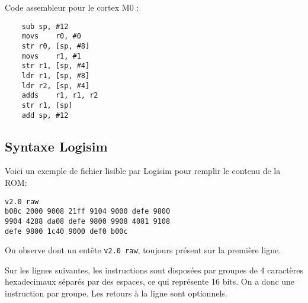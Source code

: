 Code assembleur pour le cortex M0 :
\begin{lstlisting}
	sub	sp, #12
	movs	r0, #0
	str	r0, [sp, #8]
	movs	r1, #1
	str	r1, [sp, #4]
	ldr	r1, [sp, #8]
	ldr	r2, [sp, #4]
	adds	r1, r1, r2
	str	r1, [sp]
	add	sp, #12
\end{lstlisting}

\subsection{Syntaxe Logisim}

Voici un exemple de fichier lisible par Logisim pour remplir le contenu de la ROM:

\begin{lstlisting}
v2.0 raw
b08c 2000 9008 21ff 9104 9000 defe 9800
9904 4288 da08 defe 9800 9908 4081 9108
defe 9800 1c40 9000 def0 b00c
\end{lstlisting}

On observe dont un entête \texttt{v2.0 raw}, toujours présent sur la première ligne.

Sur les lignes suivantes, les instructions sont disposées par groupes de 4 caractères hexadecimaux séparés par des espaces, ce qui représente 16 bits.
On a donc une instruction par groupe. Les retours à la ligne sont optionnels.

